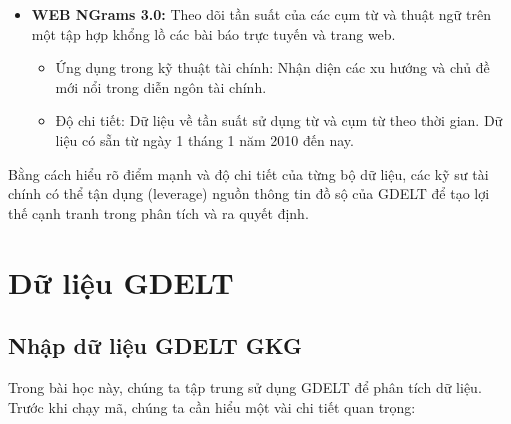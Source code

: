 \begin{itemize}
  \begin{itemize}
    \item
    Ứng dụng trong kỹ thuật tài chính: Phân tích tác động địa lý của các sự kiện đối với đầu tư và thị trường.
  \item
    Độ chi tiết: Dữ liệu theo vị trí gắn với các sự kiện và lượt đề cập. Dữ liệu có sẵn từ ngày 1 tháng 1 năm 1979 đến nay (đồng bộ với Events 2.0).
  \end{itemize}
\item
  \textbf{WEB NGrams 3.0:} Theo dõi tần suất của các cụm từ và thuật ngữ trên một tập hợp khổng lồ các bài báo trực tuyến và trang web.

  \begin{itemize}
    \item
    Ứng dụng trong kỹ thuật tài chính: Nhận diện các xu hướng và chủ đề mới nổi trong diễn ngôn tài chính.
  \item
    Độ chi tiết: Dữ liệu về tần suất sử dụng từ và cụm từ theo thời gian. Dữ liệu có sẵn từ ngày 1 tháng 1 năm 2010 đến nay.
  \end{itemize}
\end{itemize}

Bằng cách hiểu rõ điểm mạnh và độ chi tiết của từng bộ dữ liệu, các kỹ sư tài chính có thể tận dụng (leverage) nguồn thông tin đồ sộ của GDELT để tạo lợi thế cạnh tranh trong phân tích và ra quyết định.

\section{Dữ liệu GDELT}

\subsection{Nhập dữ liệu GDELT GKG}

Trong bài học này, chúng ta tập trung sử dụng GDELT để phân tích dữ liệu. Trước khi chạy mã, chúng ta cần hiểu một vài chi tiết quan trọng:

